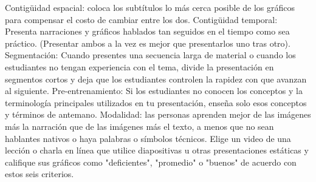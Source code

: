 Contigüidad espacial:
coloca los subtítulos lo más cerca posible de los gráficos para compensar el costo de cambiar entre los dos.
Contigüidad temporal:
Presenta narraciones y gráficos hablados tan seguidos en el tiempo como sea práctico. (Presentar ambos a la vez es mejor que presentarlos uno tras otro).
Segmentación:
Cuando presentes una secuencia larga de material o cuando los estudiantes no tengan experiencia con el tema, divide la presentación en segmentos cortos y deja que los estudiantes controlen la rapidez con que avanzan al siguiente.
Pre-entrenamiento:
Si los estudiantes no conocen los conceptos y la terminología principales utilizados en tu presentación, enseña solo esos conceptos y términos de antemano.
Modalidad:
las personas aprenden mejor de las imágenes más la narración que de las imágenes más el texto, a menos que no sean hablantes nativos o haya palabras o símbolos técnicos.
Elige un video de una lección o charla en línea que utilice diapositivas u otras presentaciones estáticas y califique sus gráficos como "deficientes", "promedio" o "buenos" de acuerdo con estos seis criterios.
